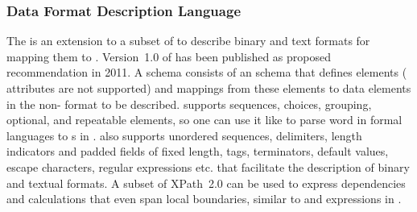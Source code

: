 \subsubsection{Data Format Description Language}
\label{sec:dfdl}

The  is an extension to a subset
of  to describe binary and text formats for mapping them to
 \cite{Beardsmore2007,Powell2011}. Version~1.0 of  has
been published as proposed recommendation in 2011. A  schema
consists of an  schema that defines  elements (
attributes are not supported) and mappings from these elements to data elements
in the non- format to be described.  supports sequences,
choices, grouping, optional, and repeatable elements, so one can use it like
 to parse word in formal languages to s in .  also supports unordered sequences,
delimiters, length indicators and padded fields of fixed length, tags,
terminators, default values, escape characters, regular expressions etc. that
facilitate the description of binary and textual formats. A subset of XPath~2.0
can be used to express dependencies and calculations that even span local
boundaries, similar to  and  expressions in
.


